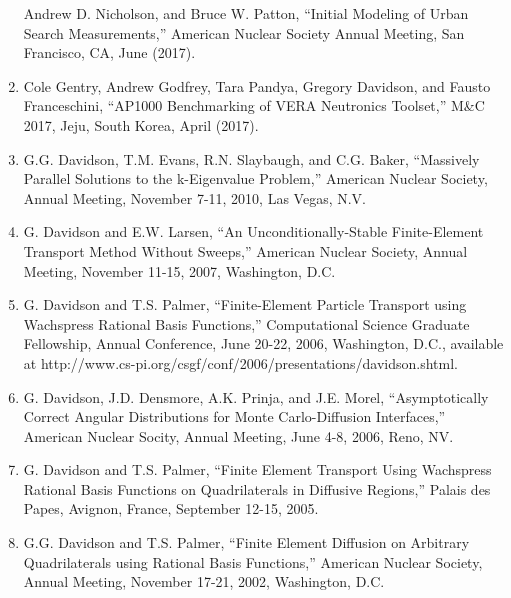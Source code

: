 \documentclass[letterpaper,11pt]{article}
\begin{document}
\begin{enumerate}
    Andrew D. Nicholson, and Bruce W. Patton, ``Initial Modeling of
    Urban Search Measurements,'' American Nuclear Society Annual
    Meeting, San Francisco, CA, June (2017).
  \item Cole Gentry, Andrew Godfrey, Tara Pandya, Gregory Davidson,
    and Fausto Franceschini, ``AP1000 Benchmarking of VERA Neutronics
    Toolset,'' M\&C 2017, Jeju, South Korea, April (2017).
  \item G.G. Davidson, T.M. Evans, R.N. Slaybaugh, and C.G. Baker,
    ``Massively Parallel Solutions to the k-Eigenvalue Problem,''
    American Nuclear Society, Annual Meeting, November 7-11, 2010, Las
    Vegas, N.V.
  \item G. Davidson and E.W. Larsen, ``An Unconditionally-Stable
    Finite-Element Transport Method Without Sweeps,'' American Nuclear
    Society, Annual Meeting, November 11-15, 2007, Washington, D.C.
  \item G. Davidson and T.S. Palmer, ``Finite-Element Particle
    Transport using Wachspress Rational Basis Functions,''
    Computational Science Graduate Fellowship, Annual Conference, June
    20-22, 2006, Washington, D.C., available at
    http://www.cs-pi.org/csgf/conf/2006/presentations/davidson.shtml.
  \item G. Davidson, J.D. Densmore, A.K. Prinja, and J.E. Morel,
    ``Asymptotically Correct Angular Distributions for Monte
    Carlo-Diffusion Interfaces,'' American Nuclear Socity, Annual
    Meeting, June 4-8, 2006, Reno, NV.
  \item G. Davidson and T.S. Palmer, ``Finite Element Transport Using
    Wachspress Rational Basis Functions on Quadrilaterals in Diffusive
    Regions,'' Palais des Papes, Avignon, France, September 12-15,
    2005.
  \item G.G. Davidson and T.S. Palmer, ``Finite Element Diffusion on
    Arbitrary Quadrilaterals using Rational Basis Functions,'' American
    Nuclear Society, Annual Meeting, November 17-21, 2002, Washington,
    D.C.
\end{enumerate}

\end{document}
